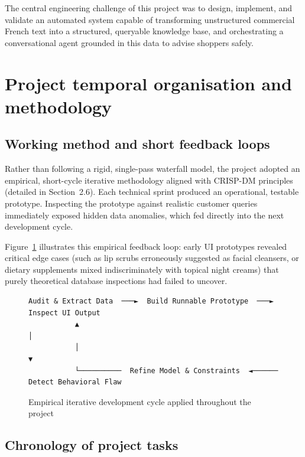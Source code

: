 The central engineering challenge of this project was to design, implement, and validate an automated system capable of transforming unstructured commercial French text into a structured, queryable knowledge base, and orchestrating a conversational agent grounded in this data to advise shoppers safely.

\section{Project temporal organisation and methodology}

\subsection{Working method and short feedback loops}

Rather than following a rigid, single-pass waterfall model, the project adopted an empirical, short-cycle iterative methodology aligned with CRISP-DM principles (detailed in Section~2.6). Each technical sprint produced an operational, testable prototype. Inspecting the prototype against realistic customer queries immediately exposed hidden data anomalies, which fed directly into the next development cycle.

Figure~\ref{fig:method} illustrates this empirical feedback loop: early UI prototypes revealed critical edge cases (such as lip scrubs erroneously suggested as facial cleansers, or dietary supplements mixed indiscriminately with topical night creams) that purely theoretical database inspections had failed to uncover.

\begin{figure}[H]
\centering
\begin{minipage}{0.92\textwidth}
\begin{lstlisting}[frame=single, basicstyle=\ttfamily\footnotesize]
   Audit & Extract Data  ───►  Build Runnable Prototype  ───►  Inspect UI Output
           ▲                                                         │
           │                                                         ▼
           └──────────  Refine Model & Constraints  ◄──────  Detect Behavioral Flaw
\end{lstlisting}
\end{minipage}
\caption{Empirical iterative development cycle applied throughout the project}
\label{fig:method}
\end{figure}

\subsection{Chronology of project tasks}

